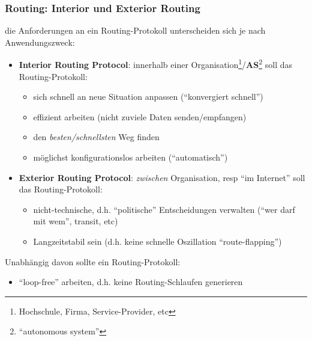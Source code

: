 \documentclass[ignorenonframetext]{beamer}
\begin{document}
\begin{frame}
\frametitle{Routing: Interior und Exterior Routing}
die Anforderungen an ein Routing-Protokoll unterscheiden sich je nach Anwendungszweck:
\begin{itemize}
	\item{\textbf{Interior Routing Protocol}: innerhalb einer Organisation\footnote{Hochschule, Firma, Service-Provider, etc}/\textbf{AS}\footnote{``autonomous system''} soll das Routing-Protokoll:\begin{small}
	    \begin{itemize}
	       \item{sich schnell an neue Situation anpassen (``konvergiert schnell'')}
	       \item{effizient arbeiten (nicht zuviele Daten senden/empfangen)}
	       \item{den {\em besten/schnellsten} Weg finden}
	       \item{m\"oglichst konfigurationslos arbeiten (``automatisch'')}
      \end{itemize}\end{small}}
	\item{\textbf{Exterior Routing Protocol}: {\em zwischen} Organisation, resp ``im Internet'' soll das Routing-Protokoll:\begin{small}
	    \begin{itemize}
	       \item{nicht-technische, d.h. ``politische'' Entscheidungen verwalten (``wer darf mit wem'', transit, etc)}
	       \item{Langzeitstabil sein (d.h. keine schnelle Oszillation ``route-flapping'')}
      \end{itemize}\end{small}}
\end{itemize}
Unabh\"angig davon sollte ein Routing-Protokoll:
\begin{itemize}
	\item{``loop-free'' arbeiten, d.h. keine Routing-Schlaufen generieren}
\end{itemize}
\end{frame}
\end{document}
